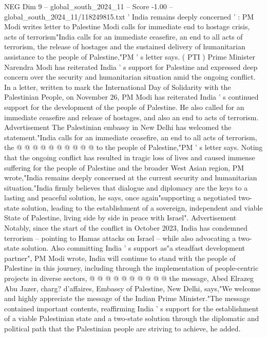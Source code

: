 \begin{textsample}{NEG Dim 9 – global\_south\_2024\_11 – Score -1.00 – global\_south\_2024\_11/118249815.txt}  \label{ex:f9_neg_314}
' India remains deeply concerned ' : PM Modi writes letter to Palestine Modi calls for immediate end to hostage crisis, acts of terrorism"India calls for an immediate ceasefire, an end to all acts of terrorism, the release of hostages and the sustained delivery of humanitarian assistance to the people of Palestine,"PM ' s letter says. ( PTI ) Prime Minister Narendra Modi has reiterated India ' s support for Palestine and expressed deep concern over the security and humanitarian situation amid the ongoing conflict.
In a letter, written to mark the International Day of Solidarity with the Palestinian People, on November 26, PM Modi has reiterated India ' s continued support for the development of the people of Palestine.
He also called for an immediate ceasefire and release of hostages, and also an end to acts of terrorism.
Advertisement The Palestinian embassy in New Delhi has welcomed the statement."India calls for an immediate ceasefire, an end to all acts of terrorism, the @ @ @ @ @ @ @ @ @ @ to the people of Palestine,"PM ' s letter says.
Noting that the ongoing conflict has resulted in tragic loss of lives and caused immense suffering for the people of Palestine and the broader West Asian region, PM wrote,"India remains deeply concerned at the current security and humanitarian situation."India firmly believes that dialogue and diplomacy are the keys to a lasting and peaceful solution, he says, once again"supporting a negotiated two-state solution, leading to the establishment of a sovereign, independent and viable State of Palestine, living side by side in peace with Israel".
Advertisement Notably, since the start of the conflict in October 2023, India has condemned terrorism -- pointing to Hamas attacks on Israel -- while also advocating a two-state solution.
Also committing India ' s support as"a steadfast development partner", PM Modi wrote, India will continue to stand with the people of Palestine in this journey, including through the implementation of people-centric projects in diverse sectors, @ @ @ @ @ @ @ @ @ @ the message, Abed Elrazeg Abu Jazer, charg? d'affaires, Embassy of Palestine, New Delhi, says,"We welcome and highly appreciate the message of the Indian Prime Minister."The message contained important contents, reaffirming India ' s support for the establishment of a viable Palestinian state and a two-state solution through the diplomatic and political path that the Palestinian people are striving to achieve, he added.

\end{textsample}

